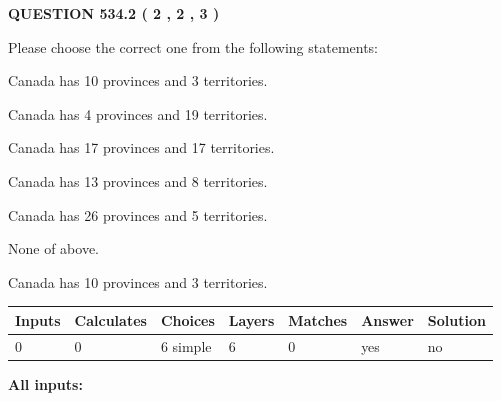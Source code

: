 \documentclass[12pt]{article}
\begin{document}
   
  
\vspace{0.2in}
  
{\textbf{\Large{QUESTION
534.2 
 ( 2 , 2 , 3 )
}}}
  
  
Please choose the correct one from the following statements:
 
 
Canada has 10  provinces and 3 territories.
 
 
Canada has   4 provinces and  19 territories.
 
 
Canada has  17 provinces and  17 territories.
 
 
Canada has  13 provinces and  8 territories.
 
 
Canada has  26 provinces and  5 territories.
 
 
 None of above.
 
 
\noindent{}
 
 
Canada has 10  provinces and 3 territories.
 
 
\noindent{}
 
 
   
   
   
   
\noindent\begin{tabular}{|l|l|l|l|l|l|l|}
 \hline
Inputs & Calculates & Choices & Layers & Matches & Answer & Solution \\ \hline
 0  & 
 0  & 
 6
  simple  
  & 
 6  & 
 0  & 
  yes & 
  no 
  \\ \hline
 \end{tabular}
   
   
   
   
\noindent{}
   
   
   
   
\noindent\vspace{0.1in}\hspace{-0.08in} {\textbf{\Large{All inputs: }}}
   
   
   
   
   
   
 \vspace{0.2in}
 
\end{document}
